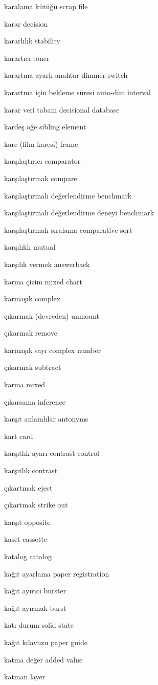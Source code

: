\documentclass[12pt,fleqn]{article}\usepackage{../../common}
\begin{document}
karalama kütüğü scrap file

karar decision

kararlılık stability

karartıcı toner

karartma ayarlı anahtar dimmer switch

karartma için bekleme süresi auto-dim interval

karar veri tabanı decisional database

kardeş öğe sibling element

kare (film karesi) frame

karşılaştırıcı comparator

karşılaştırmak compare

karşılaştırmalı değerlendirme benchmark

karşılaştırmalı değerlendirme deneyi benchmark

karşılaştırmalı sıralama comparative sort

karşılıklı mutual

karşılık vermek answerback

karma çizim mixed chart

karmaşık complex

çıkarmak (devreden) unmount

çıkarmak remove

karmaşık sayı complex number

çıkarmak subtract

karma mixed

çıkarsama inference

karşıt anlamlılar antonyms

kart card

karşıtlık ayarı contrast control

karşıtlık contrast

çıkartmak eject

çıkartmak strike out

karşıt opposite

kaset cassette

katalog catalog

kağıt ayarlama paper registration

kağıt ayırıcı burster

kağıt ayırmak burst

katı durum solid state

kağıt kılavuzu paper guide

katma değer added value

katman layer
\end{document}
